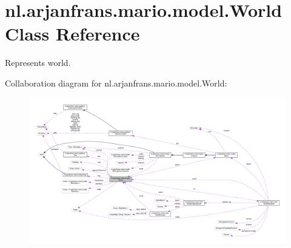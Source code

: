 \hypertarget{classnl_1_1arjanfrans_1_1mario_1_1model_1_1World}{}\section{nl.\+arjanfrans.\+mario.\+model.\+World Class Reference}
\label{classnl_1_1arjanfrans_1_1mario_1_1model_1_1World}


Represents world.  




Collaboration diagram for nl.\+arjanfrans.\+mario.\+model.\+World\+:
\nopagebreak
\begin{figure}[H]
\begin{center}
\leavevmode
\includegraphics[width=350pt]{classnl_1_1arjanfrans_1_1mario_1_1model_1_1World__coll__graph}
\end{center}
\end{figure}
